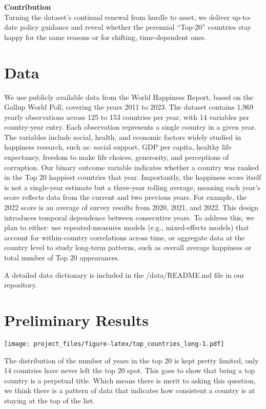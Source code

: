 \documentclass[
]{article}
\begin{document}
\textbf{Contribution}\\
Turning the dataset's continual renewal from hurdle to asset, we deliver
up-to-date policy guidance and reveal whether the perennial ``Top-20''
countries stay happy for the same reasons or for shifting,
time-dependent ones.

\section{Data}\label{data}

We use publicly available data from the World Happiness Report, based on
the Gallup World Poll, covering the years 2011 to 2023. The dataset
contains 1,969 yearly observations across 125 to 153 countries per year,
with 14 variables per country-year entry. Each observation represents a
single country in a given year. The variables include social, health,
and economic factors widely studied in happiness research, such as:
social support, GDP per capita, healthy life expectancy, freedom to make
life choices, generosity, and perceptions of corruption. Our binary
outcome variable indicates whether a country was ranked in the Top 20
happiest countries that year. Importantly, the happiness score itself is
not a single-year estimate but a three-year rolling average, meaning
each year's score reflects data from the current and two previous years.
For example, the 2022 score is an average of survey results from 2020,
2021, and 2022. This design introduces temporal dependence between
consecutive years. To address this, we plan to either: use
repeated-measures models (e.g., mixed-effects models) that account for
within-country correlations across time, or aggregate data at the
country level to study long-term patterns, such as overall average
happiness or total number of Top 20 appearances.

A detailed data dictionary is included in the /data/README.md file in
our repository.

\section{Preliminary Results}\label{preliminary-results}

\texttt{[image: project\_files/figure-latex/top\_countries\_long-1.pdf]}

The distribution of the number of years in the top 20 is kept pretty
limited, only 14 countries have never left the top 20 spot. This goes to
show that being a top country is a perpetual title. Which means there is
merit to asking this question, we think there is a pattern of data that
indicates how consistent a country is at staying at the top of the list.
\end{document}
